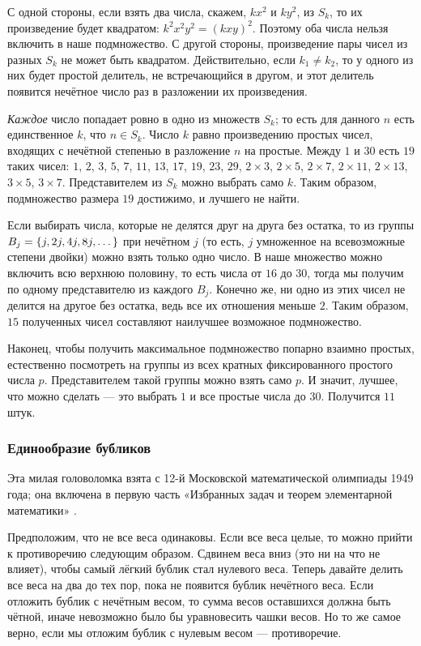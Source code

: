 С одной стороны, если взять два числа, скажем, $kx^2$ и $ky^2$, из $S_k$, то их произведение будет квадратом: $k^2x^2y^2 = (kxy)^2$.
Поэтому оба числа нельзя включить в наше подмножество.
С другой стороны, произведение пары чисел из разных $S_k$ не может быть квадратом.
Действительно, если $k_1\ne k_2$, то у одного из них будет простой делитель, не встречающийся в другом, и этот делитель появится нечётное число раз в разложении их произведения.

\emph{Каждое} число попадает ровно в одно из множеств $S_k$;
то есть для данного $n$ есть единственное $k$, что $n \in S_k$.
Число $k$ равно произведению простых чисел, входящих с нечётной степенью в разложение $n$ на простые.
Между $1$ и $30$ есть $19$ таких чисел: $1$, $2$, $3$, $5$, $7$, $11$, $13$, $17$, $19$,
$23$, $29$, $2 \times 3$, $2 \times 5$, $2 \times 7$, $2 \times 11$, $2 \times 13$, $3 \times 5$, $3 \times 7$.
Представителем из $S_k$ можно выбрать само $k$.
Таким образом, подмножество размера $19$ достижимо, и лучшего не найти.

Если выбирать числа, которые не делятся друг на друга без остатка, то из группы $B_j \z= \{j, 2j, 4j, 8j, \dots\}$ при нечётном $j$ (то есть, $j$ умноженное на всевозможные степени двойки) можно взять только одно число.
В наше множество можно включить всю верхнюю половину, то есть числа от $16$ до $30$, тогда мы получим по одному представителю из каждого $B_j$.
Конечно же, ни одно из этих чисел не делится на другое без остатка, ведь все их отношения меньше $2$.
Таким образом, $15$ полученных чисел составляют наилучшее возможное подмножество.

Наконец, чтобы получить максимальное подмножество попарно взаимно простых, естественно посмотреть на группы из всех кратных фиксированного простого числа $p$.
Представителем такой группы можно взять само $p$. 
И значит, лучшее, что можно сделать — это выбрать $1$ и все простые числа до $30$.
Получится $11$ штук.

\subsubsection*{Единообразие бубликов}

Эта милая головоломка взята с 12-й Московской математической олимпиады 1949 года;
она включена в первую часть «Избранных задач и теорем элементарной математики» %
\cite[задача 127, стр. 28]{51}.

Предположим, что не все веса одинаковы.
Если все веса целые, то можно прийти к противоречию следующим образом.
Сдвинем веса вниз (это ни на что не влияет), чтобы самый лёгкий бублик стал нулевого веса.
Теперь давайте делить все веса на два до тех пор, пока не появится бублик нечётного веса.
Если отложить бублик с нечётным весом, то сумма весов оставшихся должна быть чётной, иначе невозможно было бы уравновесить чашки весов.
Но то же самое верно, если мы отложим бублик с нулевым весом --- противоречие.

